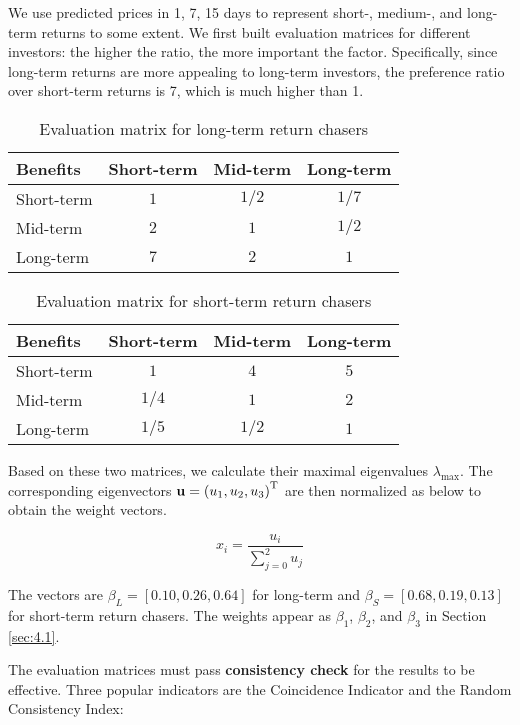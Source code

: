 \documentclass{mcmthesis}
\begin{document}
{	We use predicted prices in 1, 7, 15 days to represent short-, medium-, and long-term returns to some extent. We first built evaluation matrices for different investors: the higher the ratio, the more important the factor. Specifically, since long-term returns are more appealing to long-term investors, the preference ratio over short-term returns is 7, which is much higher than 1. 
	
	\begin{table}[h]
		\centering
		\begin{tabular}{lccc}
			\toprule
			Benefits   & Short-term & Mid-term & Long-term \\ \midrule
			Short-term & $1$ & $1/2$ & $1/7$ \\
			Mid-term   & $2$ & $1$ & $1/2$ \\
			Long-term  & $7$ & $2$ & $1$ \\ \bottomrule
		\end{tabular}
		\caption{Evaluation matrix for long-term return chasers}
	\end{table}
	
	\begin{table}[h]
		\centering
		\begin{tabular}{lccc}
			\toprule
			Benefits   & Short-term & Mid-term & Long-term \\ \midrule
			Short-term & $1$ & $4$ & $5$ \\
			Mid-term   & $1/4$ & $1$ & $2$ \\
			Long-term  & $1/5$ & $1/2$ & $1$ \\ \bottomrule
		\end{tabular}
		\caption{Evaluation matrix for short-term return chasers}
	\end{table}
	
	Based on these two matrices, we calculate their maximal eigenvalues $\lambda_{\max}$. The corresponding eigenvectors $\textbf{\textrm{u}}=\left(u_{1}, u_{2}, u_{3}\right)^{\textrm{T}}$ are then normalized as below to obtain the weight vectors. 
	
	$$x_{i}=\frac{u_{i}}{\sum_{j=0}^{2} u_{j}}$$
	
	The vectors are $\beta_L = [0.10, 0.26, 0.64]$ for long-term and $\beta_S = [0.68, 0.19, 0.13]$ for short-term return chasers. The weights appear as $\beta_1$, $\beta_2$, and $\beta_3$ in Section \ref{sec:4.1}. 
	
	The evaluation matrices must pass \textbf{consistency check} for the results to be effective. Three popular indicators are the Coincidence Indicator and the Random Consistency Index: 
	
}
\end{document}
